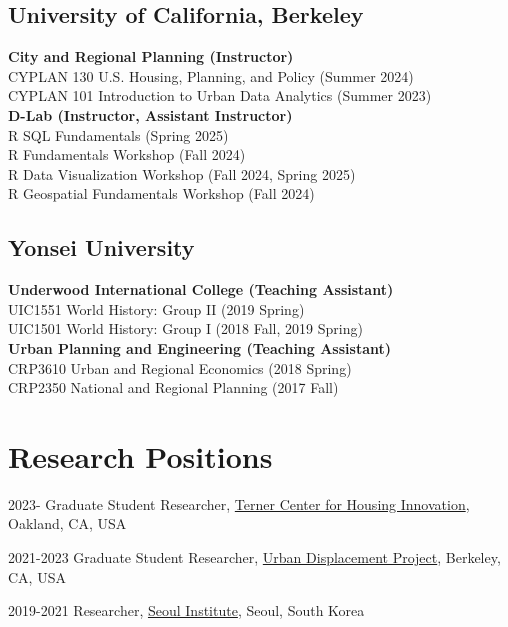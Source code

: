 \documentclass[12pt,letterpaper]{report}
\begin{document}
    \subsection*{University of California, Berkeley}
    \textbf{City and Regional Planning  (Instructor)}\\
      CYPLAN 130 U.S. Housing, Planning, and Policy (Summer 2024)\\
      CYPLAN 101 Introduction to Urban Data Analytics (Summer 2023)\\[0.6em]
    \textbf{D-Lab (Instructor, Assistant Instructor)}\\ 
      R SQL Fundamentals (Spring 2025)\\
      R Fundamentals Workshop (Fall 2024)\\
      R Data Visualization Workshop (Fall 2024, Spring 2025)\\
      R Geospatial Fundamentals Workshop (Fall 2024)

   \subsection*{Yonsei University}
   \textbf{Underwood International College (Teaching Assistant)}\\ 
    UIC1551 World History: Group II (2019 Spring)\\
    UIC1501 World History: Group I  (2018 Fall, 2019 Spring)\\[0.6em]
  \textbf{Urban Planning and Engineering (Teaching Assistant)}\\ 
    CRP3610 Urban and Regional Economics (2018 Spring)\\
    CRP2350 National and Regional Planning (2017 Fall)

  \section*{Research Positions}
    \begin{tablist}
        \item[2023-] \tab{}Graduate Student Researcher, \href{https://ternercenter.berkeley.edu/}{Terner Center for Housing Innovation}, Oakland, CA, USA
        \item[2021-2023] \tab{}Graduate Student Researcher, \href{https://www.urbandisplacement.org/}{Urban Displacement Project}, Berkeley, CA, USA
        \item[2019-2021] \tab{}Researcher, \href{si.re.kr}{Seoul Institute}, Seoul, South Korea
    \end{tablist}
\end{document}
